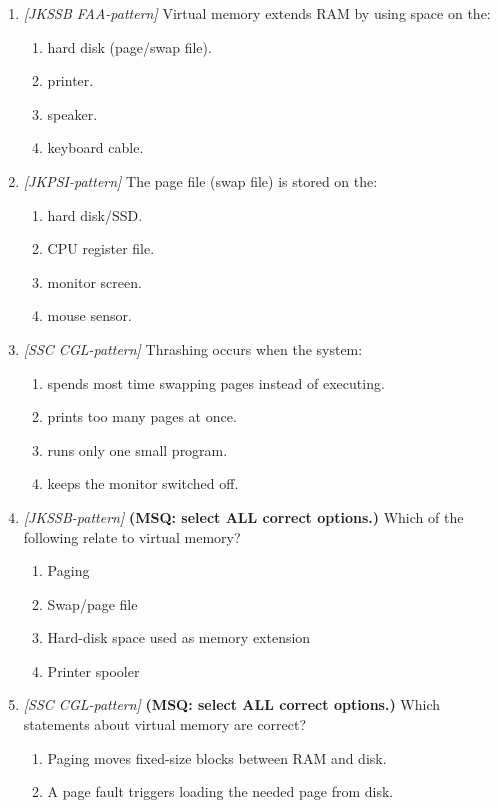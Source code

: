 \begin{enumerate}[label=\textbf{Q\arabic*.}, leftmargin=*]
\item \textit{[JKSSB FAA-pattern]} Virtual memory extends RAM by using space on the:
  \begin{enumerate}[label=\Alph*.]
    \item hard disk (page/swap file).
    \item printer.
    \item speaker.
    \item keyboard cable.
  \end{enumerate}
\item \textit{[JKPSI-pattern]} The page file (swap file) is stored on the:
  \begin{enumerate}[label=\Alph*.]
    \item hard disk/SSD.
    \item CPU register file.
    \item monitor screen.
    \item mouse sensor.
  \end{enumerate}
\item \textit{[SSC CGL-pattern]} Thrashing occurs when the system:
  \begin{enumerate}[label=\Alph*.]
    \item spends most time swapping pages instead of executing.
    \item prints too many pages at once.
    \item runs only one small program.
    \item keeps the monitor switched off.
  \end{enumerate}
\item \textit{[JKSSB-pattern]} \textbf{(MSQ: select ALL correct options.)} Which of the following relate to virtual memory?
  \begin{enumerate}[label=\Alph*.]
    \item Paging
    \item Swap/page file
    \item Hard-disk space used as memory extension
    \item Printer spooler
  \end{enumerate}
\item \textit{[SSC CGL-pattern]} \textbf{(MSQ: select ALL correct options.)} Which statements about virtual memory are correct?
  \begin{enumerate}[label=\Alph*.]
    \item Paging moves fixed-size blocks between RAM and disk.
    \item A page fault triggers loading the needed page from disk.

\end{enumerate}
\end{enumerate}
